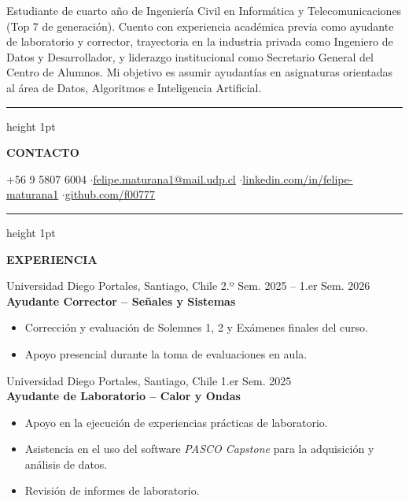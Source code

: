 \documentclass[10pt,a4paper]{article}
\newcommand{\cvsection}[1]{
    \vspace{1em}
    \hrule height 1pt
    \vspace{0.4em}
    \begin{center}
        \textbf{\large #1}
    \end{center}
    \vspace{-0.5em}
}
\begin{document}
\pagestyle{empty}

\begin{center}
    \noindent{}
\end{center}


\vspace{0.3em}
Estudiante de cuarto año de Ingeniería Civil en Informática y Telecomunicaciones (Top 7 de generación). Cuento con experiencia académica previa como ayudante de laboratorio y corrector, trayectoria en la industria privada como Ingeniero de Datos y Desarrollador, y liderazgo institucional como Secretario General del Centro de Alumnos. Mi objetivo es asumir ayudantías en asignaturas orientadas al área de Datos, Algoritmos e Inteligencia Artificial.

\cvsection{CONTACTO}
\begin{center}
    \small +56 9 5807 6004 \enspace$\cdot$\enspace \href{mailto:felipe.maturana1@mail.udp.cl}{\underline{felipe.maturana1@mail.udp.cl}} \enspace$\cdot$\enspace \href{https://www.linkedin.com/in/felipe-maturana1}{\underline{linkedin.com/in/felipe-maturana1}} \enspace$\cdot$\enspace \href{https://github.com/f00777}{\underline{github.com/f00777}}
\end{center}

\cvsection{EXPERIENCIA}

\noindent Universidad Diego Portales, Santiago, Chile \hfill 2.º Sem. 2025 – 1.er Sem. 2026\\[0.2em]
\textbf{Ayudante Corrector – Señales y Sistemas}
\vspace{-0.3em}
\begin{itemize}[leftmargin=1.5em, itemsep=2pt, parsep=0pt]
    \item Corrección y evaluación de Solemnes 1, 2 y Exámenes finales del curso.
    \item Apoyo presencial durante la toma de evaluaciones en aula.
\end{itemize}

\vspace{0.8em}
\noindent Universidad Diego Portales, Santiago, Chile \hfill 1.er Sem. 2025\\[0.2em]
\textbf{Ayudante de Laboratorio – Calor y Ondas}
\vspace{-0.3em}
\begin{itemize}[leftmargin=1.5em, itemsep=2pt, parsep=0pt]
    \item Apoyo en la ejecución de experiencias prácticas de laboratorio.
    \item Asistencia en el uso del software \textit{PASCO Capstone} para la adquisición y análisis de datos.
    \item Revisión de informes de laboratorio.
\end{itemize}
\end{document}

